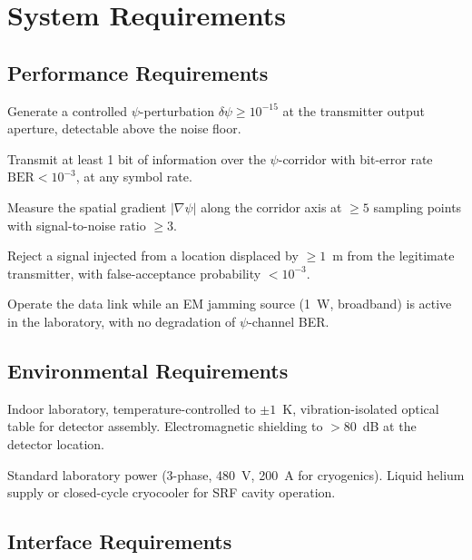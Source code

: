 \documentclass[11pt,onecolumn]{article}
\newcommand{\reqbox}[2]{%
\begin{tcolorbox}[colback=blue!3,colframe=blue!50!black,title={\textbf{REQ-#1:} #2}]
}
\newcommand{\reqend}{\end{tcolorbox}}
\begin{document}
\section{System Requirements}

\subsection{Performance Requirements}

\reqbox{P01}{Demonstrate $\psi$-field generation}
Generate a controlled $\psi$-perturbation $\delta\psi \geq 10^{-15}$
at the transmitter output aperture, detectable above the noise floor.
\reqend

\reqbox{P02}{Demonstrate information transfer}
Transmit at least 1 bit of information over the $\psi$-corridor with
bit-error rate $\mathrm{BER} < 10^{-3}$, at any symbol rate.
\reqend

\reqbox{P03}{Demonstrate corridor fingerprint measurement}
Measure the spatial gradient $|\nabla\psi|$ along the corridor axis
at $\geq 5$ sampling points with signal-to-noise ratio $\geq 3$.
\reqend

\reqbox{P04}{Demonstrate geometry-locked authentication}
Reject a signal injected from a location displaced by
$\geq 1$~m from the legitimate transmitter, with false-acceptance
probability $< 10^{-3}$.
\reqend

\reqbox{P05}{Demonstrate EM immunity}
Operate the data link while an EM jamming source (1~W, broadband)
is active in the laboratory, with no degradation of $\psi$-channel BER.
\reqend

\subsection{Environmental Requirements}

\reqbox{E01}{Operating environment}
Indoor laboratory, temperature-controlled to $\pm 1$~K, vibration-isolated
optical table for detector assembly. Electromagnetic shielding to
$> 80$~dB at the detector location.
\reqend

\reqbox{E02}{Power and infrastructure}
Standard laboratory power (3-phase, 480~V, 200~A for cryogenics).
Liquid helium supply or closed-cycle cryocooler for SRF cavity operation.
\reqend

\subsection{Interface Requirements}
\end{document}
